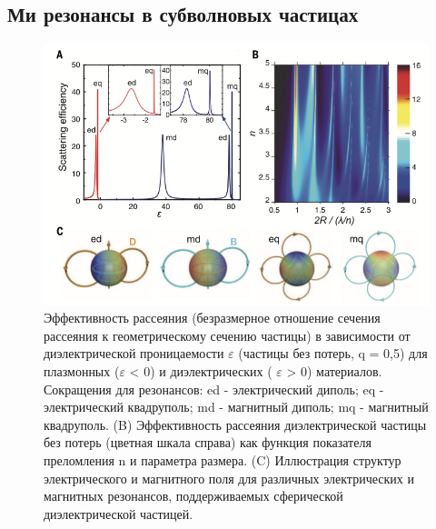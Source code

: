 \subsection{Ми резонансы в субволновых частицах}
 \begin{figure}[h!]
	\centering
	\includegraphics[width=0.7\linewidth]{images/fig1.png}
	\caption{Эффективность рассеяния (безразмерное отношение сечения рассеяния к геометрическому сечению частицы) в зависимости от диэлектрической проницаемости $\varepsilon$ (частицы без потерь, q = 0,5) для плазмонных ($\varepsilon$  < 0) и диэлектрических ( $\varepsilon$ > 0) материалов. Сокращения для резонансов: ed - электрический диполь; eq - электрический квадруполь; md - магнитный диполь; mq - магнитный квадруполь. (B) Эффективность рассеяния диэлектрической частицы без потерь (цветная шкала справа) как функция показателя преломления n и параметра размера. (C) Иллюстрация структур электрического и магнитного поля для различных электрических и магнитных резонансов, поддерживаемых сферической диэлектрической частицей.}
	\label{fig1}
\end{figure}
